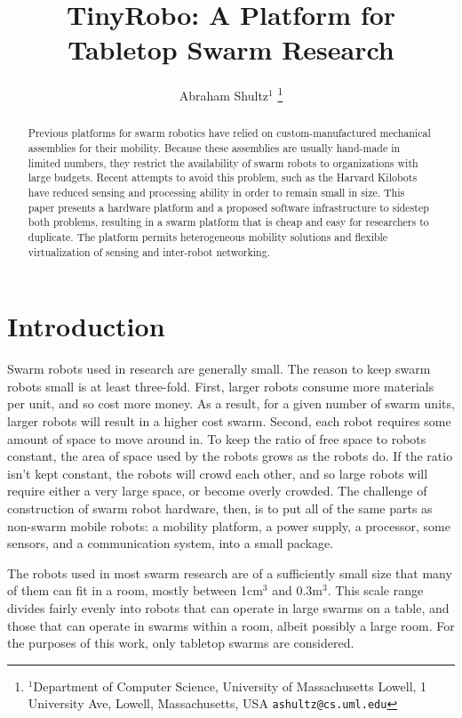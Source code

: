 \documentclass[letterpaper, 10 pt, conference]{ieeeconf}  %
\title{\LARGE \bf
TinyRobo: A Platform for Tabletop Swarm Research
}
\author{Abraham Shultz$^{1}$%
\thanks{$^{1}$Department of Computer Science,
        University of Massachusetts Lowell, 1 University Ave, Lowell, Massachusetts, USA
        {\tt\small ashultz@cs.uml.edu}}%
}
\begin{document}
\maketitle
\thispagestyle{empty}
\pagestyle{empty}


\begin{abstract}

Previous platforms for swarm robotics have relied on custom-manufactured mechanical assemblies for their mobility. Because these assemblies are usually hand-made in limited numbers, they restrict the availability of swarm robots to organizations with large budgets. Recent attempts to avoid this problem, such as the Harvard Kilobots \cite{rubenstein2014kilobot} have reduced sensing and processing ability in order to remain small in size. This paper presents a hardware platform and a proposed software infrastructure to sidestep both problems, resulting in a swarm platform that is cheap and easy for researchers to duplicate. The platform permits heterogeneous mobility solutions and flexible virtualization of sensing and inter-robot networking.   

\end{abstract}


\section{Introduction}

Swarm robots used in research are generally small. 
The reason to keep swarm robots small is at least three-fold. 
First, larger robots consume more materials per unit, and so cost more money.
As a result, for a given number of swarm units, larger robots will result in a higher cost swarm. 
Second, each robot requires some amount of space to move around in. 
To keep the ratio of free space to robots constant, the area of space used by the robots grows as the robots do. 
If the ratio isn't kept constant, the robots will crowd each other, and so large robots will require either a very large space, or become overly crowded. 
The challenge of construction of swarm robot hardware, then, is to put all of the same parts as non-swarm mobile robots: a mobility platform, a power supply, a processor, some sensors, and a communication system, into a small package.

The robots used in most swarm research are of a sufficiently small size that many of them can fit in a room, mostly between 1cm$^3$ and 0.3m$^3$. 
This scale range divides fairly evenly into robots that can operate in large swarms on a table, and those that can operate in swarms within a room, albeit possibly a large room. 
For the purposes of this work, only tabletop swarms are considered. 
\end{document}
